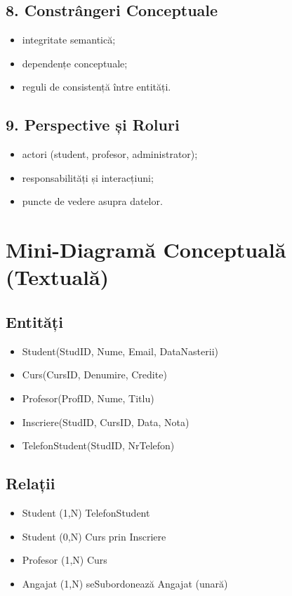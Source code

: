 \documentclass[12pt,a4paper]{article}
\begin{document}
\subsection*{8. Constrângeri Conceptuale}
\begin{itemize}[noitemsep]
    \item integritate semantică;
    \item dependențe conceptuale;
    \item reguli de consistență între entități.
\end{itemize}

\subsection*{9. Perspective și Roluri}
\begin{itemize}[noitemsep]
    \item actori (student, profesor, administrator);
    \item responsabilități și interacțiuni;
    \item puncte de vedere asupra datelor.
\end{itemize}

\section{Mini-Diagramă Conceptuală (Textuală)}

\subsection*{Entități}
\begin{itemize}[noitemsep]
    \item Student(StudID, Nume, Email, DataNasterii)
    \item Curs(CursID, Denumire, Credite)
    \item Profesor(ProfID, Nume, Titlu)
    \item Inscriere(StudID, CursID, Data, Nota)
    \item TelefonStudent(StudID, NrTelefon)
\end{itemize}

\subsection*{Relații}
\begin{itemize}[noitemsep]
    \item Student (1,N) TelefonStudent
    \item Student (0,N) Curs prin Inscriere
    \item Profesor (1,N) Curs
    \item Angajat (1,N) seSubordonează Angajat (unară)
\end{itemize}
\end{document}
